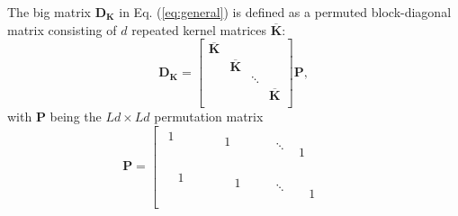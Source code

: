 The big matrix $\mathbf{D_K}$ in Eq. (\ref{eq:general}) is defined as a permuted block-diagonal matrix consisting of $d$ repeated kernel matrices $\overline{\mathbf{K}}$:
$$
\mathbf{D_K} = \left[
\begin{array}{cccc}
\overline{\mathbf{K}} &  &  &  \\
 & \overline{\mathbf{K}} &  &  \\
 &  & \ddots &   \\
 &  &  & \overline{\mathbf{K}}  \\
\end{array}
\right] \mathbf{P},
$$
with $\mathbf{P}$ being the $Ld \times Ld$ permutation matrix
$$
\mathbf{P} = \left[
\begin{array}{c|c|c|c}
\begin{matrix}
1 & & &\\
 & & &\\
 & & &\\
  & & &\\
\end{matrix} &\begin{matrix}
 & & & \\
1 & & &\\
 & & & \\
  & & & \\
\end{matrix}  & \ddots & \begin{matrix}
 & & &\\
 & & &\\
 & & &\\
1 & & &\\
\end{matrix} \\
\hline
\begin{matrix}
 &1 & &\\
 & & &\\
 & & &\\
  & & &\\
\end{matrix} &\begin{matrix}
 & & & \\
 & 1& &\\
 & & & \\
  & & & \\
\end{matrix}  & \ddots & \begin{matrix}
 & & &\\
 & & &\\
 & & &\\
 &1 & &\\

\end{matrix}
\end{array}$$
